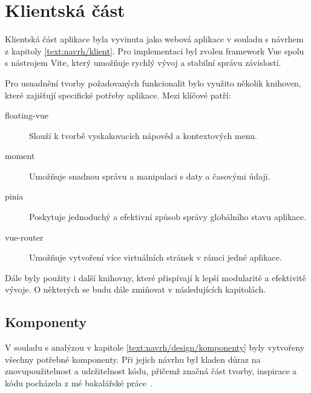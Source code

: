 \section{Klientská část}\label{text:realizace/klient}

Klientská část aplikace byla vyvinuta jako webová aplikace v souladu s návrhem z kapitoly \ref{text:navrh/klient}. 
Pro implementaci byl zvolen framework Vue spolu s nástrojem Vite, který umožňuje rychlý vývoj a stabilní správu závislostí.

Pro usnadnění tvorby požadovaných funkcionalit bylo využito několik knihoven, které zajišťují specifické potřeby aplikace. 
Mezi klíčové patří:

\begin{description}
    \item[floating-vue] Slouží k tvorbě vyskakovacích nápověd a kontextových menu.
    \item[moment] Umožňuje snadnou správu a manipulaci s daty a časovými údaji.
    \item[pinia] Poskytuje jednoduchý a efektivní způsob správy globálního stavu aplikace.
    \item[vue-router] Umožňuje vytvoření více virtuálních stránek v rámci jedné aplikace.
\end{description}

Dále byly použity i další knihovny, které přispívají k lepší modularitě a efektivitě vývoje.
O některých se budu dále zmiňovat v následujících kapitolách.



\subsection{Komponenty}

V souladu s analýzou v kapitole \ref{text:navrh/design/komponenty} byly vytvořeny všechny potřebné komponenty. 
Při jejich návrhu byl kladen důraz na znovupoužitelnost a udržitelnost kódu, přičemž značná část tvorby, inspirace a kódu pocházela z mé bakalářské práce~\cite{cajthaml_bp}.

